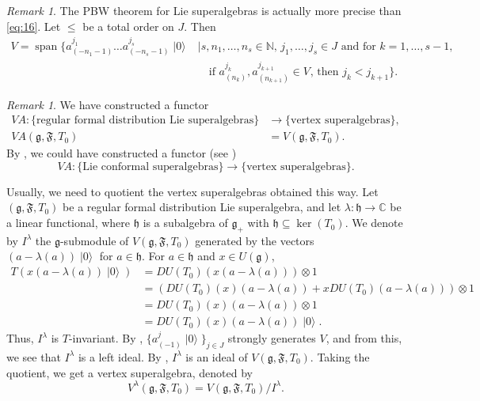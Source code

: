 \documentclass[a4paper, 12pt, reqno]{amsart}
\theoremstyle{remark}
\newtheorem{remark}[theorem]{Remark}
\DeclareMathOperator{\vspan}{span}
\DeclareMathOperator{\vac}{|0\rangle}
\DeclareMathOperator{\one}{\overline{1}}
\begin{document}
\begin{remark}
  \label{rmk:13}
  The PBW theorem for Lie superalgebras is actually more precise than \eqref{eq:16}.
  Let $\le$ be a total order on $J$.
  Then
  \begin{equation*}
    \begin{split}
      V = \vspan\{a^{j_1}_{(-n_1 - 1)}\dots a^{j_s}_{(-n_s - 1)}\vac &\mid \text{$s, n_1, \dots, n_s \in \mathbb{N}$, $j_1, \dots, j_s \in J$ and for $k = 1, \dots, s - 1$,} \\
                                                                     &\quad \text{if $a^{j_k}_{(n_k)}, a^{j_{k + 1}}_{(n_{k + 1})} \in V_{\one}$, then $j_k < j_{k + 1}$}\}.
    \end{split}
  \end{equation*}
\end{remark}

\begin{remark}
  \label{rmk:14}
  We have constructed a functor
  \begin{align*}
    VA: \{\text{regular formal distribution Lie superalgebras}\} &\to \{\text{vertex superalgebras}\}, \\
    VA(\mathfrak{g}, \mathfrak{F}, T_0) &= V(\mathfrak{g}, \mathfrak{F}, T_0).
  \end{align*}
  By , we could have constructed a functor (see \cite[Theorem 2.15]{li_vertex_2004})
  \begin{equation*}
    VA: \{\text{Lie conformal superalgebras}\} \to \{\text{vertex superalgebras}\}.
  \end{equation*}
\end{remark}

Usually, we need to quotient the vertex superalgebras obtained this way.
Let $(\mathfrak{g}, \mathfrak{F}, T_0)$ be a regular formal distribution Lie superalgebra, and let $\lambda: \mathfrak{h} \to \mathbb{C}$ be a linear functional, where $\mathfrak{h}$ is a subalgebra of $\mathfrak{g}_+$ with $\mathfrak{h} \subseteq \ker(T_0)$.
We denote by $I^{\lambda}$ the $\mathfrak{g}$-submodule of $V(\mathfrak{g}, \mathfrak{F}, T_0)$ generated by the vectors $(a - \lambda(a))\vac$ for $a \in \mathfrak{h}$.
For $a \in \mathfrak{h}$ and $x \in U(\mathfrak{g})$,
\begin{align*}
  T(x(a - \lambda(a))\vac) &= DU(T_0)(x(a - \lambda(a)))\otimes1 \\
                           &= (DU(T_0)(x)(a - \lambda(a)) + xDU(T_0)(a - \lambda(a)))\otimes1 \\
                           &= DU(T_0)(x)(a - \lambda(a))\otimes1 \\
                           &= DU(T_0)(x)(a - \lambda(a))\vac.
\end{align*}
Thus, $I^{\lambda}$ is $T$-invariant.
By , $\{a^j_{(-1)}\vac\}_{j \in J}$ strongly generates $V$, and from this, we see that $I^{\lambda}$ is a left ideal.
By , $I^{\lambda}$ is an ideal of $V(\mathfrak{g}, \mathfrak{F}, T_0)$.
Taking the quotient, we get a vertex superalgebra, denoted by
\begin{equation*}
  V^{\lambda}(\mathfrak{g}, \mathfrak{F}, T_0) = V(\mathfrak{g}, \mathfrak{F}, T_0)/I^{\lambda}.
\end{equation*}
\end{document}
